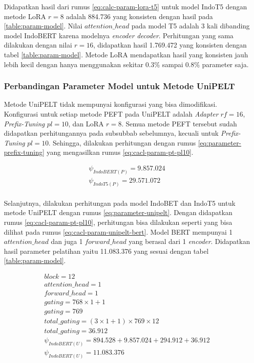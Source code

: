 Didapatkan hasil dari rumus \ref{eq:calc-param-lora-t5} untuk model IndoT5 dengan metode LoRA $r=8$ adalah 884.736 yang konsisten dengan hasil pada \ref{table:param-model}. Nilai $attention\_head$ pada model T5 adalah 3 kali dibanding model IndoBERT karena modelnya \textit{encoder decoder}. Perhitungan yang sama dilakukan dengan nilai $r=16$, didapatkan hasil 1.769.472 yang konsisten dengan tabel \ref{table:param-model}. Metode LoRA mendapatkan hasil yang konsisten jauh lebih kecil dengan hanya menggunakan sekitar 0.3\% sampai 0.8\% parameter saja.

\subsubsection{Perbandingan Parameter Model untuk Metode UniPELT}

Metode UniPELT tidak mempunyai konfigurasi yang bisa dimodifikasi. Konfigurasi untuk setiap metode PEFT pada UniPELT adalah \textit{Adapter} $rf=16$, \textit{Prefix-Tuning} $pl=10$, dan LoRA $r=8$. Semua metode PEFT tersebut sudah didapatkan perhitungannya pada subsubbab sebelumnya, kecuali untuk \textit{Prefix-Tuning} $pl=10$. Sehingga, dilakukan perhitungan dengan rumus \ref{eq:parameter-prefix-tuning} yang mengasilkan rumus \ref{eq:cacl-param-pt-pl10}.

\begin{equation}
    \begin{aligned}
        \psi_{IndoBERT(P)} = 9.857.024 \\
        \psi_{IndoT5(P)} = 29.571.072 \\
    \end{aligned}
    \label{eq:cacl-param-pt-pl10}
\end{equation}

Selanjutnya, dilakukan perhitungan pada model IndoBET dan IndoT5 untuk metode UniPELT dengan rumus \ref{eq:parameter-unipelt}. Dengan didapatkan rumus \ref{eq:cacl-param-pt-pl10}, perhitungan bisa dilakukan seperti yang bisa dilihat pada rumus \ref{eq:cacl-param-unipelt-bert}. Model BERT mempunyai 1 $attention\_head$ dan juga 1 $forward\_head$ yang berasal dari 1 \textit{encoder}. Didapatkan hasil parameter pelatihan yaitu 11.083.376 yang sesuai dengan tabel \ref{table:param-model}.

\begin{equation}
    \begin{aligned}
        block = 12 \\
        attention\_head = 1 \\
        forward\_head = 1 \\
        gating = 768 \times 1 + 1 \\
        gating = 769 \\
        total\_gating = (3 \times 1 + 1) \times 769 \times 12 \\
        total\_gating = 36.912 \\
        \psi_{IndoBERT(U)} = 894.528 + 9.857.024 + 294.912 + 36.912 \\
        \psi_{IndoBERT(U)} = 11.083.376
    \end{aligned}
    \label{eq:cacl-param-unipelt-bert}
\end{equation}

